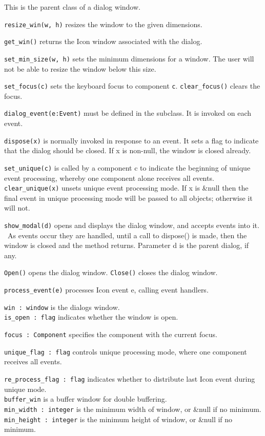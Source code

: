This is the parent class of a dialog window.

\noindent\texttt{resize\_win(w, h)} resizes the window to the given dimensions.

\noindent\texttt{get\_win()} returns the Icon window associated with the dialog.

\noindent\texttt{set\_min\_size(w, h)} sets the minimum dimensions for a window. The user
will not be able to resize the window below this size.

\noindent\texttt{set\_focus(c)} sets the keyboard focus to component \texttt{c}.
\texttt{clear\_focus()} clears the focus.

\noindent\texttt{dialog\_event(e:Event)} must be defined in the subclass. It is
invoked on each event.

\noindent\texttt{dispose(x)} is normally invoked in response to an event.
It sets a
flag to indicate that the dialog should be closed. If x is non-null,
the window is closed already.

\noindent\texttt{set\_unique(c)} is called by a component c to indicate the beginning of
unique event processing, whereby one component alone receives all
events.\\
\texttt{clear\_unique(x)} unsets unique event processing mode. If x is \&null
then the final event in unique processing mode will be passed to all
objects; otherwise it will not.

\texttt{show\_modal(d)} opens and displays the dialog window, and accepts events
into it. \ As events occur they are handled, until a call to dispose()
is made, then the window is closed and the method returns. Parameter d
is the parent dialog, if any.

\texttt{Open()} opens the dialog window.
\texttt{Close()} closes the dialog window.

\texttt{process\_event(e)} processes Icon event e, calling event handlers.

\texttt{win : window} is the dialog{\textquotesingle}s window.\\
\texttt{is\_open : flag} indicates whether the window is open.

\texttt{focus : Component} specifies the component with the current focus.

\texttt{unique\_flag : flag} controls unique processing mode, where one
component receives all events.

\texttt{re\_process\_flag : flag} indicates whether to distribute last
Icon event during unique mode.\\
\texttt{buffer\_win} is a buffer window for double buffering.\\
\texttt{min\_width : integer} is the minimum width of window, or \&null if no
minimum.\\
\texttt{min\_height : integer} is the minimum height of window, or \&null if no
minimum.

